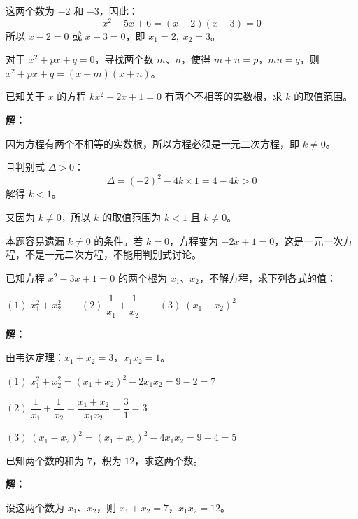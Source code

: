 \documentclass[12pt, a4paper]{ctexart}
\begin{document}
这两个数为 $-2$ 和 $-3$，因此：
\[
x^2 - 5x + 6 = (x-2)(x-3) = 0
\]
所以 $x-2=0$ 或 $x-3=0$，即 $\boxed{x_1 = 2,\; x_2 = 3}$。

\begin{tipbox}[十字相乘法口诀]
对于 $x^2+px+q=0$，寻找两个数 $m$、$n$，使得 $m+n=p$，$mn=q$，则 $x^2+px+q=(x+m)(x+n)$。
\end{tipbox}

\begin{examplebox}[【例5】判别式的应用]
已知关于 $x$ 的方程 $kx^2-2x+1=0$ 有两个不相等的实数根，求 $k$ 的取值范围。
\end{examplebox}

\textbf{解：}

因为方程有两个不相等的实数根，所以方程必须是一元二次方程，即 $k \neq 0$。

且判别式 $\Delta > 0$：
\[
\Delta = (-2)^2 - 4k \times 1 = 4 - 4k > 0
\]
解得 $k < 1$。

又因为 $k \neq 0$，所以 $k$ 的取值范围为 $\boxed{k < 1 \text{ 且 } k \neq 0}$。

\begin{warnbox}[易错提醒]
本题容易遗漏 $k \neq 0$ 的条件。若 $k=0$，方程变为 $-2x+1=0$，这是一元一次方程，不是一元二次方程，不能用判别式讨论。
\end{warnbox}

\begin{examplebox}[【例6】韦达定理的综合应用]
已知方程 $x^2-3x+1=0$ 的两个根为 $x_1$、$x_2$，不解方程，求下列各式的值：

$(1)\; x_1^2 + x_2^2 \qquad (2)\; \dfrac{1}{x_1} + \dfrac{1}{x_2} \qquad (3)\; (x_1 - x_2)^2$
\end{examplebox}

\textbf{解：}

由韦达定理：$x_1 + x_2 = 3$，$x_1 x_2 = 1$。

$(1)\; x_1^2 + x_2^2 = (x_1+x_2)^2 - 2x_1 x_2 = 9 - 2 = \boxed{7}$

$(2)\; \dfrac{1}{x_1} + \dfrac{1}{x_2} = \dfrac{x_1+x_2}{x_1 x_2} = \dfrac{3}{1} = \boxed{3}$

$(3)\; (x_1-x_2)^2 = (x_1+x_2)^2 - 4x_1 x_2 = 9 - 4 = \boxed{5}$

\begin{examplebox}[【例7】构造一元二次方程]
已知两个数的和为 $7$，积为 $12$，求这两个数。
\end{examplebox}

\textbf{解：}

设这两个数为 $x_1$、$x_2$，则 $x_1+x_2=7$，$x_1 x_2=12$。
\end{document}
